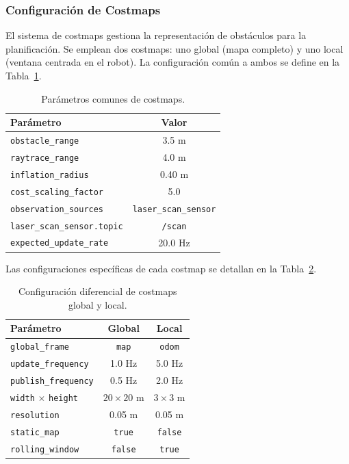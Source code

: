 \documentclass[12pt,letterpaper]{article}
\begin{document}
\subsubsection{Configuración de Costmaps}

El sistema de costmaps gestiona la representación de obstáculos para la planificación. Se emplean dos costmaps: uno global (mapa completo) y uno local (ventana centrada en el robot). La configuración común a ambos se define en la Tabla~\ref{tab:costmap_common}.

\begin{table}[H]
    \centering
    \caption{Parámetros comunes de costmaps.}
    \label{tab:costmap_common}
    \begin{tabular}{lc}
        \hline
        \textbf{Parámetro} & \textbf{Valor} \\
        \hline
        \texttt{obstacle\_range} & 3.5 m \\
        \texttt{raytrace\_range} & 4.0 m \\
        \texttt{inflation\_radius} & 0.40 m \\
        \texttt{cost\_scaling\_factor} & 5.0 \\
        \texttt{observation\_sources} & \texttt{laser\_scan\_sensor} \\
        \texttt{laser\_scan\_sensor.topic} & \texttt{/scan} \\
        \texttt{expected\_update\_rate} & 20.0 Hz \\
        \hline
    \end{tabular}
\end{table}

Las configuraciones específicas de cada costmap se detallan en la Tabla~\ref{tab:costmaps}.

\begin{table}[H]
    \centering
    \caption{Configuración diferencial de costmaps global y local.}
    \label{tab:costmaps}
    \begin{tabular}{lcc}
        \hline
        \textbf{Parámetro} & \textbf{Global} & \textbf{Local} \\
        \hline
        \texttt{global\_frame} & \texttt{map} & \texttt{odom} \\
        \texttt{update\_frequency} & 1.0 Hz & 5.0 Hz \\
        \texttt{publish\_frequency} & 0.5 Hz & 2.0 Hz \\
        \texttt{width} $\times$ \texttt{height} & $20\times20$ m & $3\times3$ m \\
        \texttt{resolution} & 0.05 m & 0.05 m \\
        \texttt{static\_map} & \texttt{true} & \texttt{false} \\
        \texttt{rolling\_window} & \texttt{false} & \texttt{true} \\
        \hline
    \end{tabular}
\end{table}
\end{document}
